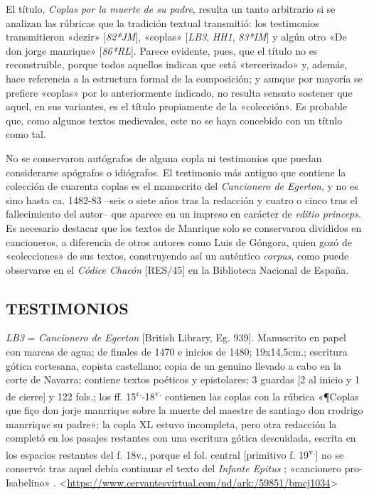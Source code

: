 \documentclass[11pt,a4paper,twoside]{article}
\newcommand{\comillas}[1]{«#1»}
\newcommand{\tsup}[1]{\textsuperscript{#1}}
\begin{document}
El título, \textit{Coplas por la muerte de su padre}, resulta un tanto arbitrario si se analizan las rúbricas que la tradición textual transmitió: los testimonios transmitieron \comillas{dezir} [\textit{82*JM}], \comillas{coplas} [\textit{LB3}, \textit{HH1}, \textit{83*IM}] y algún otro \comillas{De don jorge manrique} [\textit{86*RL}]. Parece evidente, pues, que el título no es reconstruible, porque todos aquellos indican que está \comillas{tercerizado} y, además, hace referencia a la estructura formal de la composición; y aunque por mayoría se prefiere \comillas{coplas} por lo anteriormente indicado, no resulta sensato sostener que aquel, en sus variantes, es el título propiamente de la \comillas{colección}. Es probable que, como algunos textos medievales, este no se haya concebido con un título como tal.

No se conservaron autógrafos de alguna copla ni testimonios que puedan considerarse apógrafos o idiógrafos. El testimonio más antiguo que contiene la colección de cuarenta coplas es el manuscrito del \textit{Cancionero de Egerton}, y no es sino hasta ca. 1482-83 --seis o siete años tras la redacción y cuatro o cinco tras el fallecimiento del autor-- que aparece en un impreso en carácter de \textit{editio princeps}. Es necesario destacar que los textos de Manrique solo se conservaron divididos en cancioneros, a diferencia de otros autores como Luis de Góngora, quien gozó de \comillas{colecciones} de sus textos, construyendo así un auténtico \textit{corpus}, como puede observarse en el \textit{Códice Chacón} [RES/45] en la Biblioteca Nacional de España.

\subsection*{\fontsize{11}{14}\selectfont TESTIMONIOS}

\textit{LB3} = \textit{Cancionero de Egerton} [British Library, Eg. 939].
%
Manuscrito en papel con marcas de agua; de finales de 1470 e inicios de 1480; 19x14,5cm.; escritura gótica cortesana, copista castellano; copia de un genuino llevado a cabo en la corte de Navarra; contiene textos poéticos y epistolares; 3 guardas [2 al inicio y 1 de cierre] y 122 fols.; los ff. 15\tsup{r.}-18\tsup{v.} contienen las coplas con la rúbrica \comillas{¶Coplas que fiço don jorje manrriq\textit{ue} sobre la muerte del maestre de santiago don rrodrigo manrriq\textit{ue} su padre}; la copla XL estuvo incompleta, pero otra redacción la completó en los pasajes restantes con una escritura gótica descuidada, escrita en los espacios restantes del f. 18v., porque el fol. central [primitivo f. 19\tsup{v.}] no se conservó: tras aquel debía continuar el texto del \textit{Infante Epitus} \textcite{Beltrán2011}; \comillas{cancionero pro-Isabelino} \parencite{Severin2000}. <\url{https://www.cervantesvirtual.com/nd/ark:/59851/bmcj1034}>
\end{document}
